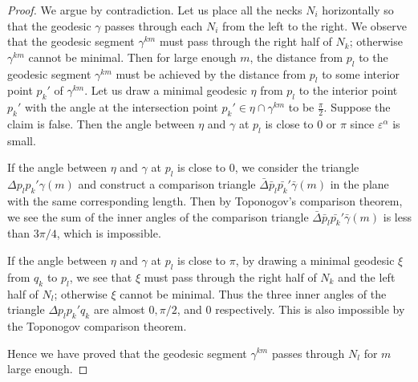 \begin{proof}
We argue by contradiction. Let us place all the necks $N_i$
horizontally so that the geodesic $\gamma$ passes through each
$N_i$ from the left to the right. We observe that the geodesic
segment $\gamma^{km}$ must pass through the right half of $N_k$;
otherwise $\gamma^{km}$ cannot be minimal. Then for large enough
$m$, the distance from $p_{l}$ to the geodesic segment
$\gamma^{km}$ must be achieved by the distance from $p_l$ to some
interior point ${p_k}'$ of $\gamma^{km}$. Let us draw a minimal
geodesic $\eta$ from $p_{l}$ to the interior point ${p_k}'$ with
the angle at the intersection point ${p_k}'\in \eta\cap
\gamma^{km}$ to be $\frac{\pi}{2}.$ Suppose the claim is false.
Then the angle between $\eta$ and $\gamma$ at $p_{l}$ is close to
$0$ or $\pi$ since $\varepsilon^\alpha$ is small.

If the angle between $\eta$ and $\gamma$ at $p_{l}$ is close to
$0$, we consider the triangle ${\Delta} {p}_{l}{p_k}'{\gamma}(m)$
and construct a comparison triangle $ \bar{\Delta}
\bar{p}_{l}\bar{p_k}'\bar{\gamma}(m)$ in the plane with the same
corresponding length. Then by Toponogov's comparison theorem, we
see the sum of the inner angles of the comparison triangle $
\bar{\Delta} \bar{p}_{l}\bar{p_k}'\bar{\gamma}(m)$ is less than
$3\pi/4$, which is impossible.

If the angle between $\eta$ and $\gamma$ at $p_{l}$ is close to
$\pi$, by drawing a minimal geodesic $\xi$ from $q_k$ to $p_{l}$,
we see that $\xi$ must pass through the right half of $N_k$ and
the left half of $N_l$; otherwise $\xi$ cannot be minimal. Thus
the three inner angles of the triangle $\Delta p_{l}{p_k}'q_k$ are
almost $0,\pi/2$, and $0$ respectively. This is also impossible by
the Toponogov comparison theorem.

Hence we have proved that the geodesic segment $\gamma^{km}$
passes through $N_l$ for $m$ large enough.


\end{proof}
